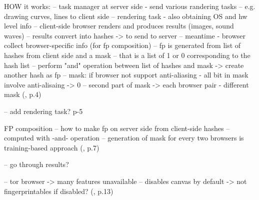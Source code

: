 HOW it works:
-- task manager at server side - send various randering tasks
-- e.g. drawing curves, lines to client side
-- rendering task - also obtaining OS and hw level info
-- client-side browser renders and produces results (images, sound waves)
-- results convert into hashes -> to send to server
-- meantime - browser collect browser-specific info (for fp composition)
-- fp is generated from list of hashes from client side and a mask
-- that is a list of 1 or 0 corresponding to the hash list
-- perform "and" operation between list of hashes and mask -> create another hash as fp
-- mask: if browser not support anti-aliasing - all bit in mask involve anti-alisaing -> 0
-- second part of mask -> each browser pair - different mask
(\textcite{Cao17}, p.4)

-- add rendering task? p-5

FP composition
-- how to make fp on server side from client-side hashes
-- computed with -and- operation
-- generation of mask for every two browsers is training-based approach
(\textcite{Cao17}, p.7)

-- go through results?

-- tor browser -> many features unavailable
-- disables canvas by default -> not fingerprintables if disabled?
(\textcite{Cao17}, p.13)